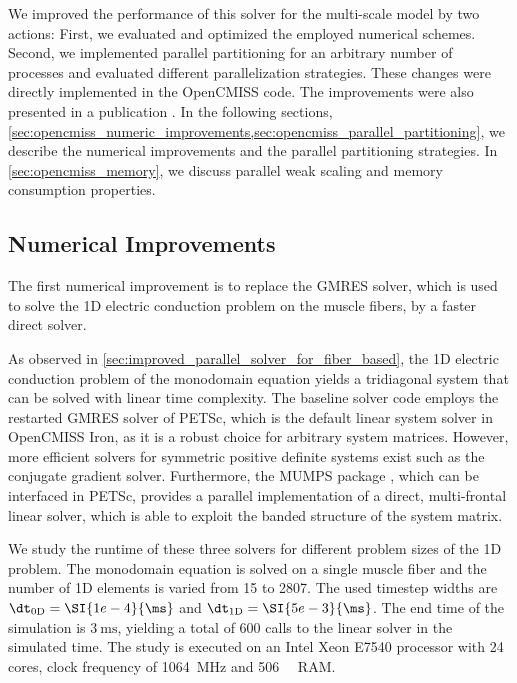 We improved the performance of this solver for the multi-scale model by two actions: First, we evaluated and optimized the employed numerical schemes. Second, we implemented parallel partitioning for an arbitrary number of processes and evaluated different parallelization strategies.
These changes were directly implemented in the OpenCMISS code. The improvements were also presented in a publication \cite{Bradley:2018:EDB}. In the following sections, \cref{sec:opencmiss_numeric_improvements,sec:opencmiss_parallel_partitioning}, we describe the numerical improvements and the parallel partitioning strategies. In \cref{sec:opencmiss_memory}, we discuss parallel weak scaling and memory consumption properties.

\subsection{Numerical Improvements}\label{sec:opencmiss_numeric_improvements}

The first numerical improvement is to replace the GMRES solver, which is used to solve the 1D electric conduction problem on the muscle fibers,
by a faster direct solver. 

As observed in \cref{sec:improved_parallel_solver_for_fiber_based}, the 1D electric conduction problem of the monodomain equation yields a tridiagonal system that can be solved with linear time complexity. The baseline solver code employs the restarted GMRES solver of PETSc, which is the default linear system solver in OpenCMISS Iron, as it is a robust choice for arbitrary system matrices. 
However, more efficient solvers for symmetric positive definite systems exist such as the conjugate gradient solver. 
Furthermore, the MUMPS package \cite{mumps2001}, which can be interfaced in PETSc, provides a parallel implementation of a direct, multi-frontal linear solver, which is able to exploit the banded structure of the system matrix.

We study the runtime of these three solvers for different problem sizes of the 1D problem. The monodomain equation is solved on a single muscle fiber and the number of 1D elements is varied from 15 to 2807. The used timestep widths are $\dt_\text{0D}=\SI{1e-4}{\ms}$ and $\dt_\text{1D}=\SI{5e-3}{\ms}$. The end time of the simulation is $\SI{3}{\ms}$, yielding a total of 600 calls to the linear solver in the simulated time. The study is executed on an Intel Xeon E7540 processor with 24 cores, clock frequency of \SI{1064}{\mega\hertz} and \SI{506}{\gibi\byte} RAM.

